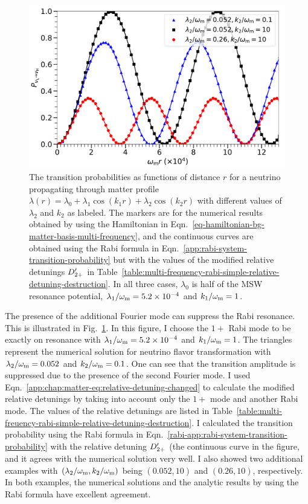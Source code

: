 \begin{figure}[!htbp]
    \centering
    \includegraphics[width=\columnwidth]{chapters/assets/matter/interference-reduction-slide-with-legend}
    \caption{The transition probabilities as functions of distance $r$ for a neutrino propagating through matter profile $\lambda(r) = \lambda_0 + \lambda_1 \cos (k_1 r) + \lambda_2 \cos (k_2 r)$ with different values of $\lambda_2$ and $k_2$ as labeled. The markers are for the numerical results obtained by using the Hamiltonian in Eqn.~\ref{eq-hamiltonian-bg-matter-basis-multi-frequency}, and the continuous curves are obtained using the Rabi formula in Eqn.~\ref{app:rabi-system-transition-probability} but with the values of the modified relative detunings $D'_{2+}$ in Table~\ref{table:multi-frequency-rabi-simple-relative-detuning-destruction}. In all three cases, $\lambda_0$ is half of the MSW resonance potential, $\lambda_1/\omega_\mathrm m = 5.2\times 10^{-4}$ and $k_1/\omega_\mathrm m = 1$.}
    \label{fig-rabi-oscillations-energy-gap-change}
\end{figure}

The presence of the additional Fourier mode can suppress the Rabi resonance. This is illustrated in Fig.~\ref{fig-rabi-oscillations-energy-gap-change}. In this figure, I choose the $1+$ Rabi mode to be exactly on resonance with $\lambda_1/\omega_\mathrm m=5.2\times 10^{-4}$ and $k_1/\omega_\mathrm m=1$. The triangles represent the numerical solution for neutrino flavor transformation with $\lambda_2/\omega_\mathrm m=0.052$ and $k_2/\omega_\mathrm m=0.1$. One can see that the transition amplitude is suppressed due to the presence of the second Fourier mode. I used Eqn.~\ref{app:chap:matter-eq:relative-detuning-changed} to calculate the modified relative detunings by taking into account only the $1+$ mode and another Rabi mode. The values of the relative detunings are listed in Table~\ref{table:multi-freuency-rabi-simple-relative-detuning-destruction}. I calculated the transition probability using the Rabi formula in Eqn.~\ref{rabi-app:rabi-system-transition-probability} with the relative detuning $D'_{2+}$ (the continuous curve in the figure, and it agrees with the numerical solution very well. I also showed two additional examples with $(\lambda_2/\omega_\mathrm m, k_2/\omega_\mathrm m)$ being $(0.052, 10)$ and $(0.26, 10)$, respectively. In both examples, the numerical solutions and the analytic results by using the Rabi formula have excellent agreement.

